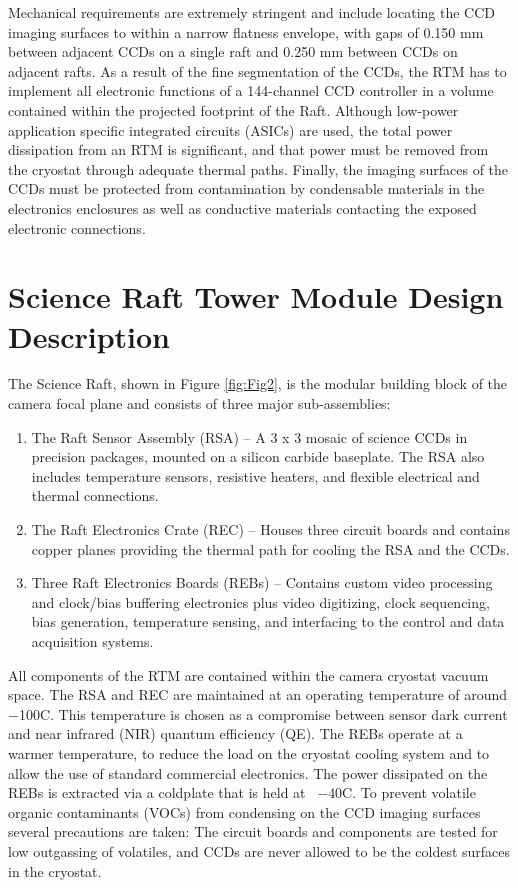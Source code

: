 Mechanical requirements are extremely stringent and include locating the CCD imaging surfaces to within a narrow flatness envelope, with gaps of 0.150 mm between adjacent CCDs on a single raft and 0.250 mm between CCDs on adjacent rafts. As a result of the fine segmentation of the CCDs, the RTM has to implement all electronic functions of a 144-channel CCD controller in a volume contained within the projected footprint of the Raft. Although low-power application specific integrated circuits (ASICs) are used, the total power dissipation from an RTM is significant, and that power must be removed from the cryostat through adequate thermal paths. Finally, the imaging surfaces of the CCDs must be protected from contamination by condensable materials in the electronics enclosures as well as conductive materials contacting the exposed electronic connections.

\section{Science Raft Tower Module Design Description}
The Science Raft, shown in Figure \ref{fig:Fig2}, is the modular building block of the camera focal plane and consists of three major sub-assemblies:
\begin{enumerate}
\item{}The Raft Sensor Assembly (RSA) – A 3 x 3 mosaic of science CCDs in precision packages, mounted on a silicon carbide baseplate. The RSA also includes temperature sensors, resistive heaters, and flexible electrical and thermal connections.
\item{}The Raft Electronics Crate (REC) – Houses three circuit boards and contains copper planes providing the thermal path for cooling the RSA and the CCDs.
\item{}Three Raft Electronics Boards (REBs) – Contains custom video processing and clock/bias buffering electronics plus video digitizing, clock sequencing, bias generation, temperature sensing, and interfacing to the control and data acquisition systems. 
\end{enumerate}

All components of the RTM are contained within the camera cryostat vacuum space. The RSA and REC are maintained at an operating temperature of around $-$100\degsym C. This temperature is chosen as a compromise between sensor dark current and near infrared (NIR) quantum efficiency (QE). The REBs operate at a warmer temperature, to reduce the load on the cryostat cooling system and to allow the use of standard commercial electronics. The power dissipated on the REBs is extracted via a coldplate that is held at \
$-$40\degsym  C. To prevent volatile organic contaminants (VOCs) from condensing on the CCD imaging surfaces several precautions are taken: The circuit boards and components are tested for low outgassing of volatiles, and CCDs are never allowed to be the coldest surfaces in the cryostat. 
 
